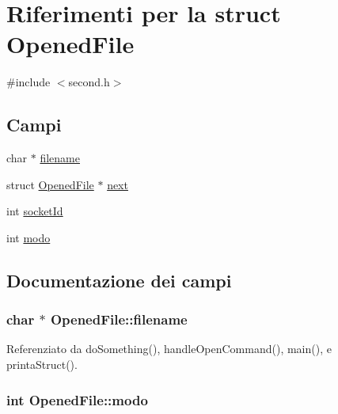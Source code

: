 \hypertarget{structOpenedFile}{}\section{Riferimenti per la struct Opened\+File}
\label{structOpenedFile}


{\ttfamily \#include $<$second.\+h$>$}

\subsection*{Campi}
\begin{DoxyCompactItemize}
\item 
char $\ast$ \hyperlink{structOpenedFile_a81b8b1a4aa166633efe210508a8820e1}{filename}
\item 
struct \hyperlink{structOpenedFile}{Opened\+File} $\ast$ \hyperlink{structOpenedFile_a9b8c8b995cdda6da249a6ce9a9df98b2}{next}
\item 
int \hyperlink{structOpenedFile_a2af35018ecff06dbd349d464c815038a}{socket\+Id}
\item 
int \hyperlink{structOpenedFile_a6d9f22ff6ba81506ba9c4a60f27c4f32}{modo}
\end{DoxyCompactItemize}


\subsection{Documentazione dei campi}
\hypertarget{structOpenedFile_a81b8b1a4aa166633efe210508a8820e1}{}
\subsubsection[{filename}]{\setlength{\rightskip}{0pt plus 5cm}char $\ast$ Opened\+File\+::filename}\label{structOpenedFile_a81b8b1a4aa166633efe210508a8820e1}


Referenziato da do\+Something(), handle\+Open\+Command(), main(), e printa\+Struct().

\hypertarget{structOpenedFile_a6d9f22ff6ba81506ba9c4a60f27c4f32}{}
\subsubsection[{modo}]{\setlength{\rightskip}{0pt plus 5cm}int Opened\+File\+::modo}\label{structOpenedFile_a6d9f22ff6ba81506ba9c4a60f27c4f32}


